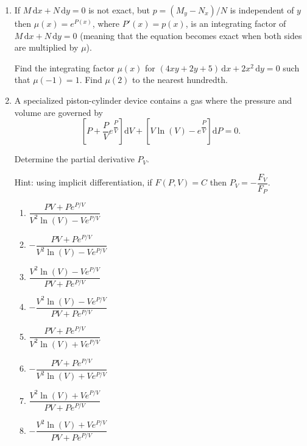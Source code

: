 \documentclass{ximera}
\begin{document}
\begin{enumerate}[label=(\arabic*)]


\newpage


\item If $M\,\mathrm{d}x+N\,\mathrm{d}y=0$ is not exact, but $p=(M_{y}-N_{x})/N$ is independent of $y$ then $\displaystyle \mu (x)= e^{P(x)}$, where $P'(x)=p(x)$, is an integrating factor of $M\,\mathrm{d}x+N\,\mathrm{d}y=0$ (meaning that the equation becomes exact when both sides are multiplied by $\mu$).


Find the integrating factor $\mu (x)$ for $(4xy+2y+5)\,\mathrm{d}x+ 2x^2\,\mathrm{d}y=0$ such that $\mu(-1)=1$.  Find $\mu(2)$ to the nearest hundredth.






\item A specialized piston-cylinder device contains a gas where the pressure  and volume are governed by \[
\left[ P+ \dfrac{P}{V}e^{\dfrac{P}{V}} \right] \mathrm{d}V + \left[ V\ln(V) - e^{\dfrac{P}{V}} \right] \mathrm{d}P = 0.
\]

Determine the partial derivative $P_V$.

Hint: using implicit differentiation, if $F(P,V)=C$ then $P_V=-\dfrac{F_V}{F_P}$.


\begin{enumerate}[label=(\alph*)]
\item $\dfrac{PV+Pe^{P/V}}{V^2\ln (V)-Ve^{P/V}}$
\item $-\dfrac{PV+Pe^{P/V}}{V^2\ln (V)-Ve^{P/V}}$ %
\item $\dfrac{V^2\ln (V)-Ve^{P/V}}{PV+Pe^{P/V}}$
\item $-\dfrac{V^2\ln (V)-Ve^{P/V}}{PV+Pe^{P/V}}$
\item $\dfrac{PV+Pe^{P/V}}{V^2\ln (V)+Ve^{P/V}}$
\item $-\dfrac{PV+Pe^{P/V}}{V^2\ln (V)+Ve^{P/V}}$
\item $\dfrac{V^2\ln (V)+Ve^{P/V}}{PV+Pe^{P/V}}$
\item $-\dfrac{V^2\ln (V)+Ve^{P/V}}{PV+Pe^{P/V}}$
\end{enumerate}



\end{enumerate}
\end{document}
